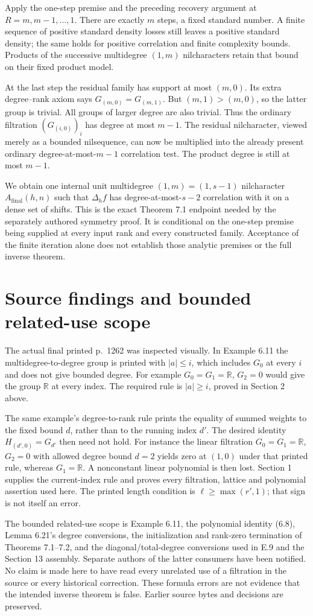 \documentclass[11pt]{article}
\newcommand{\R}{\mathbb R}\newcommand{\Q}{\mathbb Q}
\begin{document}
Apply the one-step premise and the preceding recovery argument at
$R=m,m-1,\ldots,1$. There are exactly $m$ steps, a fixed standard
number. A finite sequence of positive standard density losses still
leaves a positive standard density; the same holds for positive
correlation and finite complexity bounds. Products of the successive
multidegree $(1,m)$ nilcharacters retain that bound on their fixed
product model.

At the last step the residual family has support at most $(m,0)$.
Its extra degree--rank axiom says $G_{(m,0)}=G_{(m,1)}$.
But $(m,1)>(m,0)$, so the latter group is trivial. All groups of
larger degree are also trivial. Thus the ordinary filtration
$(G_{(i,0)})_i$ has degree at most $m-1$. The residual nilcharacter,
viewed merely as a bounded nilsequence, can now be multiplied into
the already present ordinary degree-at-most-$m-1$ correlation test.
The product degree is still at most $m-1$.

We obtain one internal unit multidegree $(1,m)=(1,s-1)$ nilcharacter
$A_{\mathrm{final}}(h,n)$ such that $\Delta_h f$ has
degree-at-most-$s-2$ correlation with it on a dense set of shifts.
This is the exact Theorem 7.1 endpoint needed by the separately
authored symmetry proof. It is conditional on the one-step premise
being supplied at every input rank and every constructed family.
Acceptance of the finite iteration alone does not establish those
analytic premises or the full inverse theorem.

\section{Source findings and bounded related-use scope}

The actual final printed p.~1262 was inspected visually. In Example 6.11
the multidegree-to-degree group is printed with $|a|\leq i$, which
includes $G_0$ at every $i$ and does not give bounded degree. For
example $G_0=G_1=\R$, $G_2=0$ would give the group $\R$ at every
index. The required rule is $|a|\geq i$, proved in Section 2 above.

The same example's degree-to-rank rule prints the equality of summed
weights to the fixed bound $d$, rather than to the running index $d'$.
The desired identity $H_{(d',0)}=G_{d'}$ then need not hold. For
instance the linear filtration $G_0=G_1=\R$, $G_2=0$ with allowed
degree bound $d=2$ yields zero at $(1,0)$ under that printed rule,
whereas $G_1=\R$. A nonconstant linear polynomial is then lost.
Section 1 supplies the current-index rule and proves every filtration,
lattice and polynomial assertion used here. The printed length
condition is $\ell\geq\max(r',1)$; that sign is not itself an error.

The bounded related-use scope is Example 6.11, the polynomial identity
(6.8), Lemma 6.21's degree conversions, the initialization and rank-zero
termination of Theorems 7.1--7.2, and the diagonal/total-degree conversions
used in E.9 and the Section 13 assembly. Separate authors of the latter
consumers have been notified. No claim is made here to have read every
unrelated use of a filtration in the source or every historical correction.
These formula errors are not evidence that the intended inverse theorem
is false. Earlier source bytes and decisions are preserved.
\end{document}
